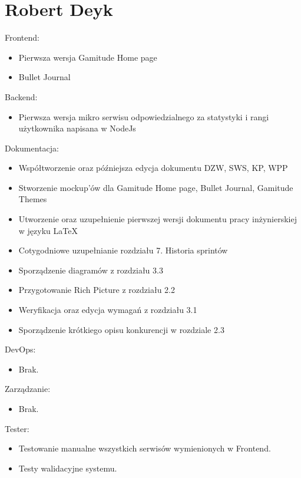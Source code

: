 \documentclass[a4paper,11pt]{report}
\begin{document}
\section {Robert Deyk}
Frontend:
\begin{itemize}
	\item Pierwsza wersja Gamitude Home page
	\item Bullet Journal
\end{itemize}
Backend:
\begin{itemize}
	\item Pierwsza wersja mikro serwisu odpowiedzialnego za statystyki i rangi użytkownika napisana w NodeJs
\end{itemize}
Dokumentacja:
\begin{itemize}
	\item Współtworzenie oraz późniejsza edycja dokumentu DZW, SWS, KP, WPP
	\item Stworzenie mockup'ów dla Gamitude Home page, Bullet Journal, Gamitude Themes
	\item Utworzenie oraz uzupełnienie pierwszej wersji dokumentu pracy inżynierskiej w języku LaTeX
	\item Cotygodniowe uzupełnianie rozdziału 7. Historia sprintów
	\item Sporządzenie diagramów z rozdziału 3.3
	\item Przygotowanie Rich Picture z rozdziału 2.2
	\item Weryfikacja oraz edycja wymagań z rozdziału 3.1
	\item Sporządzenie krótkiego opisu konkurencji w rozdziale 2.3
\end{itemize}
DevOps:
\begin{itemize}
	\item Brak.
\end{itemize}
Zarządzanie:
\begin{itemize}
	\item Brak.
\end{itemize}
Tester:
\begin{itemize}
	\item Testowanie manualne wszystkich serwisów wymienionych w Frontend.
	\item Testy walidacyjne systemu.
\end{itemize}
\end{document}
